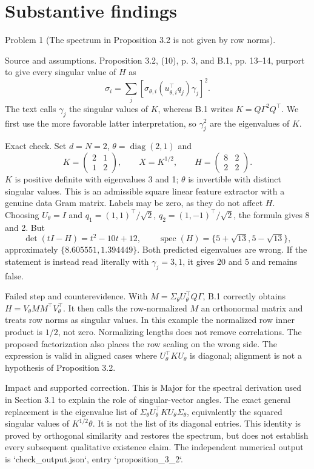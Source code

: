 \documentclass[10pt]{article}
\begin{document}
\section*{Substantive findings}
Problem 1 (The spectrum in Proposition 3.2 is not given by row norms).\par
Source and assumptions. Proposition 3.2, (10), p. 3, and B.1, pp. 13–14, purport to give every singular value of \(H\) as \[\sigma_i=\sum_j[\sigma_{\theta,i}(u_{\theta,i}^\top q_j)\gamma_j]^2.\] The text calls \(\gamma_j\) the singular values of \(K\), whereas B.1 writes \(K=Q\Gamma^2Q^\top\). We first use the more favorable latter interpretation, so \(\gamma_j^2\) are the eigenvalues of \(K\).\par
Exact check. Set \(d=N=2\), \(\theta=\operatorname{diag}(2,1)\) and \[K=\begin{pmatrix}2&1\\1&2\end{pmatrix},\qquad X=K^{1/2},\qquad
H=\begin{pmatrix}8&2\\2&2\end{pmatrix}.\] \(K\) is positive definite with eigenvalues 3 and 1; \(\theta\) is invertible with distinct singular values. This is an admissible square linear feature extractor with a genuine data Gram matrix. Labels may be zero, as they do not affect \(H\). Choosing \(U_\theta=I\) and \(q_1=(1,1)^\top/\sqrt2\), \(q_2=(1,-1)^\top/\sqrt2\), the formula gives 8 and 2. But \[\det(tI-H)=t^2-10t+12,\qquad
\operatorname{spec}(H)=\{5+\sqrt{13},5-\sqrt{13}\},\] approximately \(\{8.605551,1.394449\}\). Both predicted eigenvalues are wrong. If the statement is instead read literally with \(\gamma_j=3,1\), it gives 20 and 5 and remains false.\par
Failed step and counterevidence. With \(M=\Sigma_\theta U_\theta^\top Q\Gamma\), B.1 correctly obtains \(H=V_\theta MM^\top V_\theta^\top\). It then calls the row-normalized \(M\) an orthonormal matrix and treats row norms as singular values. In this example the normalized row inner product is \(1/2\), not zero. Normalizing lengths does not remove correlations. The proposed factorization also places the row scaling on the wrong side. The expression is valid in aligned cases where \(U_\theta^\top KU_\theta\) is diagonal; alignment is not a hypothesis of Proposition 3.2.\par
Impact and supported correction. This is Major for the spectral derivation used in Section 3.1 to explain the role of singular-vector angles. The exact general replacement is the eigenvalue list of \(\Sigma_\theta U_\theta^\top KU_\theta\Sigma_\theta\), equivalently the squared singular values of \(K^{1/2}\theta\). It is not the list of its diagonal entries. This identity is proved by orthogonal similarity and restores the spectrum, but does not establish every subsequent qualitative existence claim. The independent numerical output is `check\_output.json`, entry `proposition\_3\_2`.\par
\end{document}
